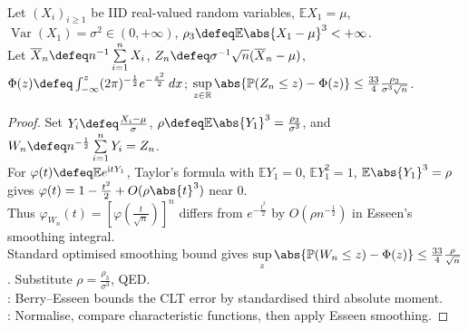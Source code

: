 \begin{theorem} \label{thm:berry-esseen-rate} \\
Let $(X_i)_{i\geq1}$ be IID real-valued random variables, $\mathbb{E}X_1=\mu$, $\operatorname{Var}(X_1)=\sigma^2\in(0,+\infty)$, $\rho_3\defeq\mathbb{E}\abs{X_1-\mu}^3<+\infty$.\\
Let $\overline{X}_n\defeq n^{-1}\sum\limits_{i=1}^{n}X_i$, $Z_n\defeq\sigma^{-1}\sqrt{n}(\overline{X}_n-\mu)$, $\Phi(z)\defeq\int_{-\infty}^{z}(2\pi)^{-\frac{1}{2}}e^{-\frac{x^2}{2}}\,dx$; $\sup\limits_{z\in\mathbb{R}}\abs{\mathbb{P}(Z_n\leq z)-\Phi(z)}\leq\frac{33}{4}\frac{\rho_3}{\sigma^3\sqrt{n}}$.
\begin{proof} Set $Y_i\defeq\frac{X_i-\mu}{\sigma}$, $\rho\defeq\mathbb{E}\abs{Y_1}^3=\frac{\rho_3}{\sigma^3}$, and $W_n\defeq n^{-\frac{1}{2}}\sum\limits_{i=1}^{n}Y_i=Z_n$.\\
For $\varphi(t)\defeq\mathbb{E}e^{\mathrm{i}tY_1}$, Taylor's formula with $\mathbb{E}Y_1=0$, $\mathbb{E}Y_1^2=1$, $\mathbb{E}\abs{Y_1}^3=\rho$ gives $\varphi(t)=1-\frac{t^2}{2}+O(\rho\abs{t}^3)$ near $0$.\\
Thus $\varphi_{W_n}(t)=[\varphi(\frac{t}{\sqrt{n}})]^n$ differs from $e^{-\frac{t^2}{2}}$ by $O(\rho n^{-\frac{1}{2}})$ in Esseen's smoothing integral.\\
Standard optimised smoothing bound gives $\sup\limits_z\abs{\mathbb{P}(W_n\leq z)-\Phi(z)}\leq\frac{33}{4}\frac{\rho}{\sqrt{n}}$. Substitute $\rho=\frac{\rho_3}{\sigma^3}$, QED.\\
: Berry--Esseen bounds the CLT error by standardised third absolute moment.\\
: Normalise, compare characteristic functions, then apply Esseen smoothing.
\end{proof}
\end{theorem}

